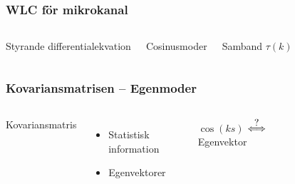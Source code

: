 \documentclass[swedish]{beamer}
\newcommand\impl{\stackrel{\mathclap{\normalfont\mbox{?}}}{\Longleftrightarrow}}
\begin{document}
\begin{frame}
\frametitle{WLC för mikrokanal}
 \begin{columns}[c]

Styrande differentialekvation
\vspace{8mm}

Cosinusmoder
\vspace{8mm}

Samband $\tau(k)$



\begin{figure}
\resizebox{!}{!}{}
\end{figure}


\end{columns}

\end{frame}


\begin{frame}
\frametitle{Kovariansmatrisen -- Egenmoder}

\begin{columns}[c]
Kovariansmatris
\begin{itemize}[label={$\bullet$}]
    \item Statistisk information
    \item Egenvektorer
\end{itemize}
\vspace{1cm}

$\cos (ks)$ $\impl$ Egenvektor

\begin{figure}

\end{figure}

\end{columns}
    
\end{frame}
\end{document}
